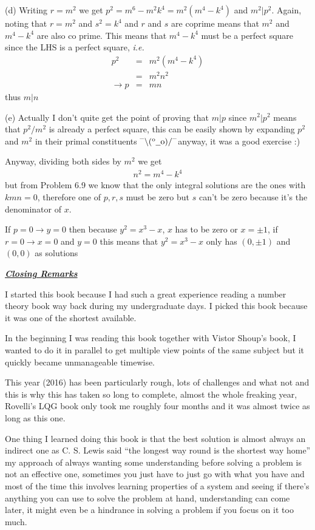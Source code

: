\documentclass[aps,preprint,preprintnumbers,nofootinbib,showpacs,prd]{revtex4-1}
\newcommand{\ie}{{\it i.e.} }
\newcommand{\nbea}{\begin{eqnarray*}}
\newcommand{\neea}{\end{eqnarray*}}
\newcommand{\dunno}{$ {}^{\mbox {--}}\backslash(^{\rm o}{}\underline{\hspace{0.2cm}}{\rm o})/^{\mbox {--}}$}
\begin{document}
(d) Writing $r = m^2$ we get $p^2 = m^6 - m^2 k^4 = m^2(m^4 - k^4)$ and $m^2|p^2$. Again, noting that $r = m^2$ and $s^2 = k^4$ and $r$ and $s$ are coprime means that $m^2$ and $m^4 - k^4$ are also co prime. This means that $m^4 - k^4$ must be a perfect square since the LHS is a perfect square, \ie
%
\nbea
p^2 & = & m^2 (m^4 - k^4) \\
& = & m^2 n^2 \\
\to p & = & mn
\neea
%
thus $m|n$

(e) Actually I don't quite get the point of proving that $m|p$ since $m^2|p^2$ means that $p^2/m^2$ is already a perfect square, this can be easily shown by expanding $p^2$ and $m^2$ in their primal constituents \dunno anyway, it was a good exercise :)

Anyway, dividing both sides by $m^2$ we get
%
\nbea
n^2 = m^4 - k^4
\neea
%
but from Problem 6.9 we know that the only integral solutions are the ones with $kmn = 0$, therefore one of $p, r, s$ must be zero but $s$ can't be zero because it's the denominator of $x$.

If $p = 0 \to y = 0$ then because $y^2 = x^3 - x$, $x$ has to be zero or $x = \pm1$, if $r = 0 \to x = 0$ and $y=0$ this means that $y^2 = x^3 - x$ only has $(0, \pm1)$ and $(0,0)$ as solutions

\bigskip
\underline{\textbf{\textit{Closing Remarks}}}
\bigskip

I started this book because I had such a great experience reading a number theory book way back during my undergraduate days. I picked this book because it was one of the shortest available.

In the beginning I was reading this book together with Vistor Shoup's book, I wanted to do it in parallel to get multiple view points of the same subject but it quickly became unmanageable timewise.

This year (2016) has been particularly rough, lots of challenges and what not and this is why this has taken so long to complete, almost the whole freaking year, Rovelli's LQG book only took me roughly four months and it was almost twice as long as this one.

One thing I learned doing this book is that the best solution is almost always an indirect one as C. S. Lewis said ``the longest way round is the shortest way home'' my approach of always wanting some understanding before solving a problem is not an effective one, sometimes you just have to just go with what you have and most of the time this involves learning properties of a system and seeing if there's anything you can use to solve the problem at hand, understanding can come later, it might even be a hindrance in solving a problem if you focus on it too much.
\end{document}
